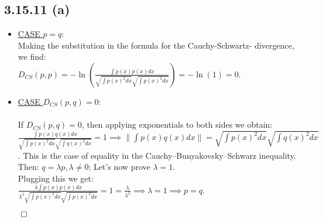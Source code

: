 \documentclass{exam}
\renewenvironment{proof}{{\noindent\itshape\ignorespaces}}{{\hfill$\qed$\\}}
\begin{document}
\subsection*{3.15.11 (a)}
\begin{proof}  
    \begin{itemize}
        \item \underline{CASE $p=q$}:\newline
        \\
        Making the substitution in the formula for the Cauchy-Schwartz- divergence, we find:\\
        $D_{CS}(p,p) = -\ln(\displaystyle\frac{\int p(x) p(x) d x}{\sqrt{\int p(x)^2 d x } \sqrt{\int p(x)^2 d x }}) = - \ln(1) = 0.$
        \item \underline{CASE $D_{CS}(p,q) = 0$}:\\
        \\
        If $D_{CS}(p,q) = 0$, then applying exponentials to both sides we obtain:\newline
        $\displaystyle\frac{\displaystyle \int p(x) q(x) d x}{\sqrt{\displaystyle\int p(x)^2 d x } \sqrt{\displaystyle\int q(x)^2 d x }} = 1 \implies \lVert \displaystyle\int p(x) q(x) d x \lVert = \sqrt{\displaystyle \int p(x)^2 d x } \sqrt{\displaystyle \int q(x)^2 d x }$. This is the case of equality in
        the Cauchy–Bunyakovsky–Schwarz inequality. Then: $q = \lambda p, \lambda \neq 0$; Let's now prove $\lambda = 1$.
        \\
        Plugging this we get: \\
        $\displaystyle\frac{\displaystyle \lambda \int p(x) p(x) d x}{\lambda^{2} \sqrt{\displaystyle\int p(x)^2 d x } \sqrt{\displaystyle\int p(x)^2 d x }} = 1 = \frac{\lambda}{\lambda^{2}} \implies \lambda  = 1 \implies p = q.$
    \end{itemize}  
\end{proof}
\end{document}
